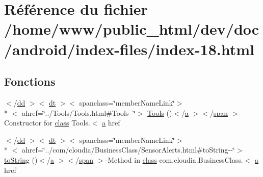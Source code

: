 \hypertarget{index-18_8html}{\section{Référence du fichier /home/www/public\-\_\-html/dev/doc/android/index-\/files/index-\/18.html}
\label{index-18_8html}
}
\subsection*{Fonctions}
\begin{DoxyCompactItemize}
\item 
$<$/\hyperlink{stylesheet_8css_a47f4718a86835a7771ec592ece845221}{dd} $>$$<$ \hyperlink{stylesheet_8css_a107565fb4039d33b041380d6e0ea1d80}{dt} $>$$<$ spanclass=\char`\"{}member\-Name\-Link\char`\"{}$>$\\*
$<$ ahref=\char`\"{}../Tools/Tools.\-html\#Tools-\/-\/\char`\"{}$>$ \hyperlink{index-18_8html_ad921a0cd0f14f9f8cec5c07bfef586f6}{Tools} ()$<$/\hyperlink{style_8css_a5e8981582017bb8b84c21f148345d1f7}{a} $>$$<$/\hyperlink{stylesheet_8css_a8343996ebcf16220b04e54659aac31cc}{span} $>$-\/Constructor for \hyperlink{_tools_8html_acf06f836132665ba8114f5a414c2403f}{class} Tools.$<$ \hyperlink{style_8css_a5e8981582017bb8b84c21f148345d1f7}{a} href
\item 
$<$/\hyperlink{stylesheet_8css_a47f4718a86835a7771ec592ece845221}{dd} $>$$<$ \hyperlink{stylesheet_8css_a107565fb4039d33b041380d6e0ea1d80}{dt} $>$$<$ spanclass=\char`\"{}member\-Name\-Link\char`\"{}$>$\\*
$<$ ahref=\char`\"{}../com/cloudia/Business\-Class/Sensor\-Alerts.\-html\#to\-String-\/-\/\char`\"{}$>$ \hyperlink{index-18_8html_acc7ea2f750678e2afdb882619aa3059b}{to\-String} ()$<$/\hyperlink{style_8css_a5e8981582017bb8b84c21f148345d1f7}{a} $>$$<$/\hyperlink{stylesheet_8css_a8343996ebcf16220b04e54659aac31cc}{span} $>$-\/Method in \hyperlink{_tools_8html_acf06f836132665ba8114f5a414c2403f}{class} com.\-cloudia.\-Business\-Class.$<$ \hyperlink{style_8css_a5e8981582017bb8b84c21f148345d1f7}{a} href
\end{DoxyCompactItemize}
